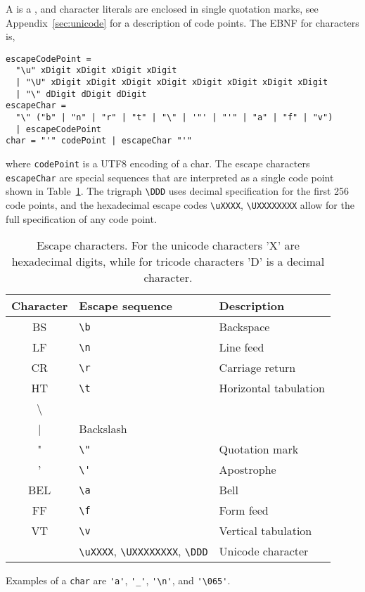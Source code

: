A  is a  , and character literals are enclosed in single quotation marks, see Appendix~\ref{sec:unicode} for a description of code points. The EBNF for characters is,
%
\begin{lstlisting}[language=ebnf]
escapeCodePoint = 
  "\u" xDigit xDigit xDigit xDigit
  | "\U" xDigit xDigit xDigit xDigit xDigit xDigit xDigit xDigit
  | "\" dDigit dDigit dDigit 
escapeChar = 
  "\" ("b" | "n" | "r" | "t" | "\" | '"' | "'" | "a" | "f" | "v")
  | escapeCodePoint
char = "'" codePoint | escapeChar "'"
\end{lstlisting}
% 
where \lstinline[language=ebnf]!codePoint! is a UTF8 encoding of a char. The escape characters \lstinline[language=ebnf]{escapeChar} are special sequences that are interpreted as a single code point shown in Table~\ref{tab:escapeChar}. The trigraph \lstinline|\DDD| uses decimal specification for the first 256 code points, and the hexadecimal escape codes \lstinline|\uXXXX|, \lstinline|\UXXXXXXXX| allow for the full specification of any code point.
\begin{table}
  \centering
  \begin{tabular}{|c|l|l|}
    \hline
    Character& Escape sequence & Description\\
    \hline
    BS &\lstinline|\b|& Backspace\\
    LF &\lstinline|\n|&Line feed\\
    CR &\lstinline|\r|&Carriage return\\
    HT &\lstinline|\t|&Horizontal tabulation\\
    \textbackslash &\lstinline|\\|&Backslash\\
     " &\lstinline|\"|&Quotation mark\\
    ' &\lstinline|\'|&Apostrophe\\
    BEL&\lstinline|\a|& Bell\\
    FF&\lstinline|\f|&Form feed\\
    VT &\lstinline|\v|&Vertical tabulation\\
    &\lstinline|\uXXXX|, \lstinline|\UXXXXXXXX|, \lstinline|\DDD|&Unicode character\\
    \hline
  \end{tabular}
  \caption{Escape characters. For the unicode characters 'X' are hexadecimal digits, while for tricode characters 'D' is a decimal character.}
  \label{tab:escapeChar}
\end{table}
Examples of a \lstinline[language=ebnf]!char! are \lstinline{'a'}, \lstinline{'_'}, \lstinline{'\n'}, and \lstinline{'\065'}.

